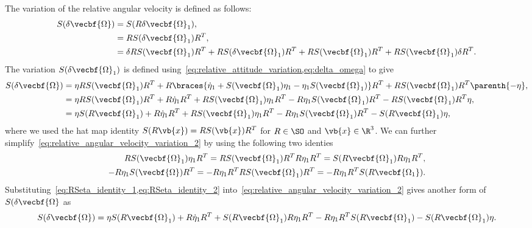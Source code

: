 \documentclass[11pt, reqno]{article}    %
\begin{document}
The variation of the relative angular velocity is defined as follows:
\begin{align}\label{eq:relative_angular_velocity_variation_1}
    S(\delta \vecbf{\Omega}) &= S(R \delta \vecbf{\Omega}_1) , \nonumber\\
    &= R S(\delta \vecbf{\Omega}_1) R^T , \nonumber \\
    &= \delta R S(\vecbf{\Omega}_1) R^T  + R S(\delta \vecbf{\Omega}_1) R^T + R S(\vecbf{\Omega}_1)R^T + R S(\vecbf{\Omega}_1) \delta R^T .
\end{align}
The variation \( S(\delta \vecbf{\Omega}_1)\) is defined using~\cref{eq:relative_attitude_variation,eq:delta_omega} to give
\begin{align}\label{eq:relative_angular_velocity_variation_2}
    S(\delta \vecbf{\Omega}) &= \eta R S( \vecbf{\Omega}_1) R^T + R \braces{\dot{\eta}_1 + S(\vecbf{\Omega}_1) \eta_1 - \eta_1 S(\vecbf{\Omega}_1)} R^T + R S( \vecbf{\Omega}_1) R^T \parenth{- \eta} , \nonumber \\
    &= \eta R S(\vecbf{\Omega}_1)R^T + R \dot{\eta}_1 R^T + R S(\vecbf{\Omega}_1) \eta_1 R^T - R \eta_1 S(\vecbf{\Omega}_1)R^T - R S(\vecbf{\Omega}_1) R^T \eta , \nonumber\\
    &= \eta S(R \vecbf{\Omega}_1) + R \dot{\eta}_1 R^T + R S(\vecbf{\Omega}_1)\eta_1 R^T - R \eta_1 S(\vecbf{\Omega}_1) R^T - S(R \vecbf{\Omega}_1) \eta ,
\end{align}
where we used the hat map identity \( S(R \vb{x}) = R S(\vb{x}) R^T\) for \( R \in \SO\) and \( \vb{x} \in \R^3\).
We can further simplify~\cref{eq:relative_angular_velocity_variation_2} by using the following two identies
\begin{align}
    R S(\vecbf{\Omega}_1) \eta_1 R^T = RS(\vecbf{\Omega}_1) R^T R \eta_1 R^T = S(R \vecbf{\Omega}_1) R \eta_1 R^T , \label{eq:RSeta_identity_1}\\
    -R \eta_1 S(\vecbf{\Omega})R^T = - R \eta_1 R^T R S(\vecbf{\Omega}_1)R^T = -R \eta_1 R^T S(R \vecbf{\Omega_1}) . \label{eq:RSeta_identity_2}
\end{align}
Substituting~\cref{eq:RSeta_identity_1,eq:RSeta_identity_2} into~\cref{eq:relative_angular_velocity_variation_2} gives another form of \( S(\delta \vecbf{\Omega}\) as
\begin{align}\label{eq:relative_angular_velocity_variation_3}
    S(\delta \vecbf{\Omega}) = \eta S(R \vecbf{\Omega}_1) + R \dot{\eta}_1 R^T + S(R \vecbf{\Omega}_1) R \eta_1 R^T - R \eta_1 R^T S(R \vecbf{\Omega}_1) - S(R \vecbf{\Omega}_1) \eta .
\end{align}
\end{document}
